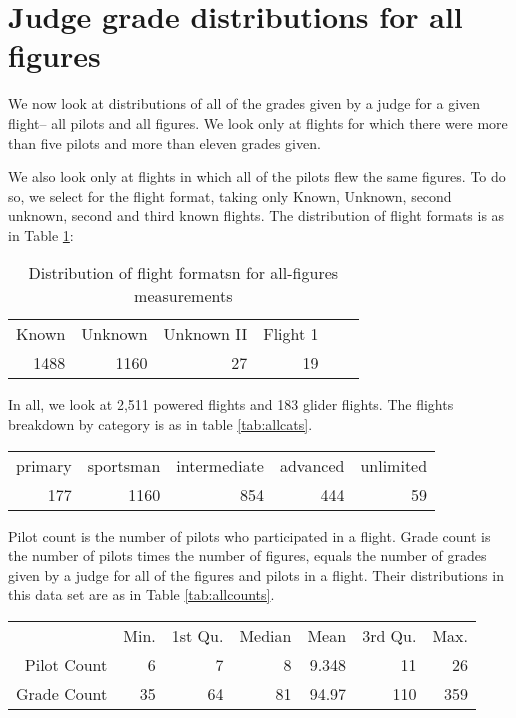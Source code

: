 \section{Judge grade distributions for all figures}

We now look at distributions of all of the grades given by a judge for
a given flight-- all pilots and all figures. We look only at flights for
which there were more than five pilots and more than eleven grades given.

We also look only at flights in which all of the pilots flew the same figures.
To do so, we select for the flight format, taking only Known, Unknown, second
unknown, second and third known flights. The distribution of flight formats is
as in Table \ref{tab:allformat}:

\begin{table}[tbp]
  \centering
  \begin{tabular}{r r r r r r}
  Known & Unknown & Unknown II & Flight 1 \\
  1488 & 1160 & 27 & 19 \\
  \end{tabular}
  \caption{Distribution of flight formatsn for all-figures measurements}
  \label{tab:allformat}
\end{table}

In all, we look at 2,511 powered flights and 183 glider flights. The flights
breakdown by category is as in table \ref{tab:allcats}.

\begin{table*}[tbp]
  \begin{tabular}{r r r r r}
  primary  & sportsman & intermediate  &  advanced  & unlimited  \\
      177  &      1160 &          854  &       444  &        59  \\
  \end{tabular}
  \caption{Distribution of categories for all-figures measurements}
  \label{tab:allcats}
\end{table*}

Pilot count is the number of pilots who participated in a flight.
Grade count is the number of pilots times the number of figures, equals
the number of grades given by a judge for all of the figures and pilots in
a flight. Their distributions in this data set are as in
Table \ref{tab:allcounts}.

\begin{table*}[tbp]
  \begin{tabular}{r | r r r r r r}
  & Min. & 1st Qu. & Median & Mean & 3rd Qu. & Max. \\
  Pilot Count &  6 &  7 &  8 & 9.348 &  11 &  26 \\
  Grade Count & 35 & 64 & 81 & 94.97 & 110 & 359 \\
  \end{tabular}
  \caption{Distribution of pilot and grade counts for all-figures measurements}
  \label{tab:allcounts}
\end{table*}

